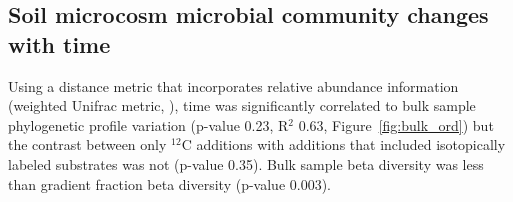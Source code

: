 \subsection{Soil microcosm microbial community changes with time}
Using a distance metric that incorporates relative abundance information
(weighted Unifrac metric, \citep{Lozupone_2005}), 
time was significantly correlated to bulk sample phylogenetic profile variation (p-value
0.23, R$^{2}$ 0.63, Figure~\ref{fig:bulk_ord}) but the contrast between only
$^{12}$C additions with additions that included isotopically labeled substrates
was not (p-value 0.35). Bulk sample beta diversity was
less than gradient fraction beta diversity (p-value 0.003). 
